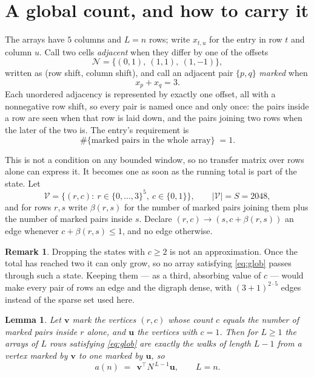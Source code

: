 \documentclass[11pt,a4paper]{article}
\theoremstyle{plain}
\newtheorem{lemma}[theorem]{Lemma}
\theoremstyle{definition}
\newtheorem{remark}[theorem]{Remark}
\begin{document}
\section{A global count, and how to carry it}

The arrays have $5$ columns and $L=n$ rows; write $x_{t,u}$ for the entry in
row $t$ and column $u$. Call two cells \emph{adjacent} when they differ by one of the
offsets
\[
\mathcal N=\{(0,1),\ (1,1),\ (1,-1)\},
\]
written as (row shift, column shift), and call an adjacent pair $\{p,q\}$
\emph{marked} when
\[
x_{p}+x_{q}=3 .
\]
Each unordered adjacency is represented by exactly one offset, all with a nonnegative row
shift, so every pair is named once and only once: the pairs inside a row are seen when
that row is laid down, and the pairs joining two rows when the later of the two is. The
entry's requirement is
\begin{equation}\label{eq:glob}
\#\{\text{marked pairs in the whole array}\}\;=1.
\end{equation}

This is not a condition on any bounded window, so no transfer matrix over rows alone can
express it. It becomes one as soon as the running total is part of the state. Let
\[
\mathcal V=\bigl\{(r,c):\ r\in\{0,\dots,3\}^{5},\ c\in\{0,1\}\bigr\},
\qquad |\mathcal V|=S=2048,
\]
and for rows $r,s$ write $\beta(r,s)$ for the number of marked pairs joining them plus the
number of marked pairs inside $s$. Declare $(r,c)\to(s,c+\beta(r,s))$ an edge whenever
$c+\beta(r,s)\le1$, and no edge otherwise.

\begin{remark}
Dropping the states with $c\ge2$ is not an approximation. Once the total has reached two it
can only grow, so no array satisfying \eqref{eq:glob} passes through such a state. Keeping
them --- as a third, absorbing value of $c$ --- would make every pair of rows an edge and
the digraph dense, with $(3+1)^{2\cdot5}$ edges instead of the sparse set used here.
\end{remark}

\begin{lemma}\label{lem:walk}
Let $\mathbf{v}$ mark the vertices $(r,c)$ whose count $c$ equals the number of marked pairs
inside $r$ alone, and $\mathbf{u}$ the vertices with $c=1$. Then for $L\ge1$ the arrays
of $L$ rows satisfying \eqref{eq:glob} are exactly the walks of length $L-1$ from a
vertex marked by $\mathbf{v}$ to one marked by $\mathbf{u}$, so
\[
a(n)\;=\;\,\mathbf{v}^{\!\top}N^{\,L-1}\mathbf{u},\qquad L=n .
\]
\end{lemma}
\end{document}
